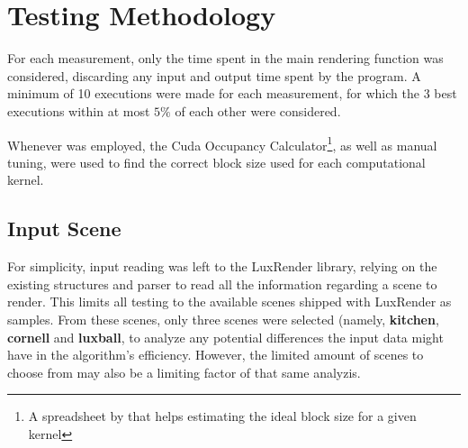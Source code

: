 \documentclass[main.tex]{subfiles}
\begin{document}
\section{Testing Methodology} \label{sec:results:method}

For each measurement, only the time spent in the main rendering function was considered, discarding any input and output time spent by the program. A minimum of 10 executions were made for each measurement, for which the 3 best executions within at most $5\%$ of each other were considered.

Whenever \cuda was employed, the Cuda Occupancy Calculator\footnote{A spreadsheet by \nvidia that helps estimating the ideal block size for a given kernel}, as well as manual tuning, were used to find the correct block size used for each computational kernel.

\subsection{Input Scene}

For simplicity, input reading was left to the LuxRender library, relying on the existing structures and parser to read all the information regarding a scene to render. This limits all testing to the available scenes shipped with LuxRender as samples. From these scenes, only three scenes were selected (namely, \textbf{kitchen}, \textbf{cornell} and \textbf{luxball}, to analyze any potential differences the input data might have in the algorithm's efficiency. However, the limited amount of scenes to choose from may also be a limiting factor of that same analyzis.
\end{document}
